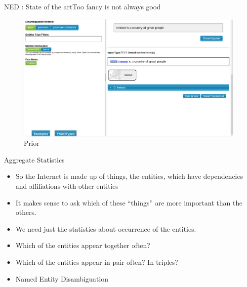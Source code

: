 \documentclass{beamer}
\begin{document}
\begin{frame}{NED : State of the art}{Too fancy is not always good}
\begin{figure}[h]
 \centering
 \includegraphics[bb=0 0 1366 768,scale=0.23]{./prior3.png}
 \caption{Prior}
\end{figure}
\end{frame}
\begin{frame}{Aggregate Statistics}
\begin{itemize}
\item So the Internet is made up of things, the entities, which have dependencies and affiliations with other entities  \medskip
\item It makes sense to ask which of these “things” are more important than the others. \medskip
\item We need just the statistics about occurrence of the entities. \medskip
\item Which of the entities appear together often? \medskip
\item Which of the entities appear in pair often? In triples? \medskip	
\item Named Entity Disambiguation
\end{itemize}
\end{frame}

\end{document}
